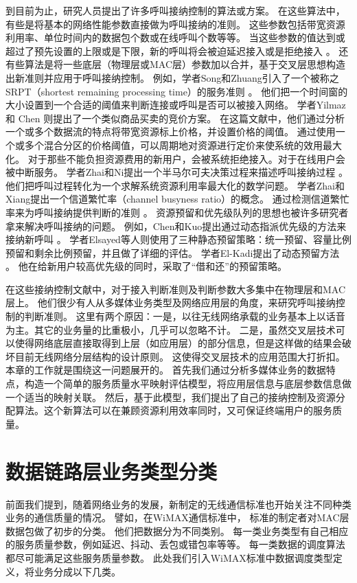 到目前为止，研究人员提出了许多呼叫接纳控制的算法或方案。
在这些算法中，有些是将基本的网络性能参数直接做为呼叫接纳的准则。
这些参数包括带宽资源利用率、单位时间内的数据包个数或在线呼叫个数等等。
当这些参数的值达到或超过了预先设置的上限或是下限，新的呼叫将会被迫延迟接入或是拒绝接入\cite{Y-Qian.TWC.2006} \cite{G-Djuka.TELSIK.2007}。
还有些算法是将一些底层（物理层或MAC层）参数加以合并，基于交叉层思想构造出新准则并应用于呼叫接纳控制。
例如，学者Song和Zhuang引入了一个被称之SRPT（shortest remaining processing time）的服务准则 \cite{Song2009}。
他们把一个时间窗的大小设置到一个合适的阈值来判断连接或呼叫是否可以被接入网络。
学者Yilmaz 和 Chen 则提出了一个类似商品买卖的竞价方案\cite{Yilmax2009}。
在这篇文献中，他们通过分析一个或多个数据流的特点将带宽资源标上价格，并设置价格的阈值。
通过使用一个或多个混合分区的价格阈值，可以周期地对资源进行定价来使系统的效用最大化。
对于那些不能负担资源费用的新用户，会被系统拒绝接入。对于在线用户会被中断服务。
学者Zhai和Ni提出一个半马尔可夫决策过程来描述呼叫接纳过程 \cite{Zhai2005,Ni2009}。
他们把呼叫过程转化为一个求解系统资源利用率最大化的数学问题。
学者Zhai和Xiang提出一个信道繁忙率（channel busyness ratio）的概念。
通过检测信道繁忙率来为呼叫接纳提供判断的准则 \cite{Zhai_Chen_Fang_2006}。
资源预留和优先级队列的思想也被许多研究者拿来解决呼叫接纳的问题。
例如，Chen和Kuo提出通过动态指派优先级的方法来接纳新呼叫 \cite{Chen_Kumar_Kuo_2003,Chen_Kuo_2004}。
学者Elsayed等人则使用了三种静态预留策略：统一预留、容量比例预留和剩余比例预留，并且做了详细的评估\cite{Elsayed02performanceevaluation}。
学者El-Kadi提出了动态预留方法 \cite{EL-Kadi2002}。
他在给新用户较高优先级的同时，采取了“借和还”的预留策略。

在这些接纳控制文献中，对于接入判断准则及判断参数大多集中在物理层和MAC层上。
他们很少有人从多媒体业务类型及网络应用层的角度，来研究呼叫接纳控制的判断准则。
这里有两个原因：一是，以往无线网络承载的业务基本上以话音为主。其它的业务量的比重极小，几乎可以忽略不计。
二是，虽然交叉层技术可以使得网络底层直接取得到上层（如应用层）的部分信息，但是这样做的结果会破坏目前无线网络分层结构的设计原则。
这使得交叉层技术的应用范围大打折扣。
本章的工作就是围绕这一问题展开的。
首先我们通过分析多媒体业务的数据特点，构造一个简单的服务质量水平映射评估模型，将应用层信息与底层参数信息做一个适当的映射关联。
然后，基于此模型，我们提出了自己的接纳控制及资源分配算法。这个新算法可以在兼顾资源利用效率同时，又可保证终端用户的服务质量。
%
\section{数据链路层业务类型分类}
前面我们提到，随着网络业务的发展，新制定的无线通信标准也开始关注不同种类业务的通信质量的情况。
譬如，在WiMAX通信标准中，
标准的制定者对MAC层数据包做了初步的分类\cite{Tsagkaris_Demestichas_2009}\cite{Andrews_Ghosh_Muhamed_2007}。
他们把数据分为不同类别。
每一类业务类型有自己相应的服务质量参数，例如延迟、抖动、丢包或错包率等等。
每一类数据的调度算法都尽可能满足这些服务质量参数。
此处我们引入WiMAX标准中数据调度类型定义，将业务分成以下几类。

